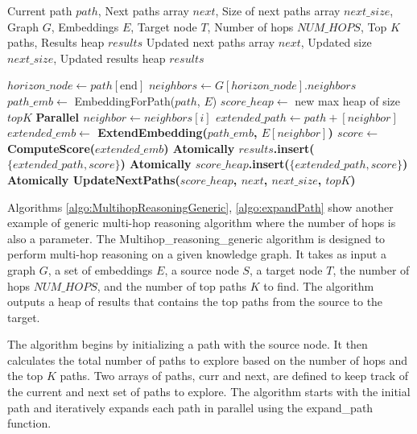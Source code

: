 \documentclass[sigconf]{acmart}
\begin{document}
\begin{algorithm}
\caption{Expand Path in Multi-Hop Reasoning}
\begin{algorithmic}[1]
\scriptsize
\Require Current path $path$, Next paths array $next$, Size of next paths array $next\_size$, Graph $G$, Embeddings $E$, Target node $T$, Number of hops $NUM\_HOPS$, Top $K$ paths, Results heap $results$
\Ensure Updated next paths array $next$, Updated size $next\_size$, Updated results heap $results$

    \State $horizon\_node \gets path[\text{end}]$
    \State $neighbors \gets G[horizon\_node].neighbors$
        \State $path\_emb \gets$ EmbeddingForPath($path$, $E$)
        \State $score\_heap \gets$ new max heap of size $topK$
        \State \bf {Parallel} 
            \State $neighbor \gets neighbors[i]$
                \State $extended\_path \gets path + [neighbor]$
                \State $extended\_emb \gets$ ExtendEmbedding($path\_emb$, $E[neighbor]$)
                \State $score \gets$ ComputeScore($extended\_emb$)
                    \State \bf {Atomically} $results$.insert($\{extended\_path, score\}$)
                \Else
                    \State \bf {Atomically} $score\_heap$.insert($\{extended\_path, score\}$)
                \EndIf
            \EndIf
        \EndFor
        \State \bf {Atomically} UpdateNextPaths($score\_heap$, $next$, $next\_size$, $topK$)
    \EndIf
\EndFunction
\end{algorithmic}
\label{algo:expandPath}
\end{algorithm}
Algorithms \ref{algo:MultihopReasoningGeneric}, \ref{algo:expandPath} show another example of generic multi-hop reasoning algorithm where the number of hops is also a parameter. The Multihop\_reasoning\_generic algorithm is designed to perform multi-hop reasoning on a given knowledge graph. It takes as input a graph $G$, a set of embeddings $E$, a source node $S$, a target node $T$, the number of hops $NUM\_HOPS$, and the number of top paths $K$ to find. The algorithm outputs a heap of results that contains the top paths from the source to the target.

The algorithm begins by initializing a path with the source node. It then calculates the total number of paths to explore based on the number of hops and the top $K$ paths. Two arrays of paths, curr and next, are defined to keep track of the current and next set of paths to explore. The algorithm starts with the initial path and iteratively expands each path in parallel using the expand\_path function.
\end{document}
